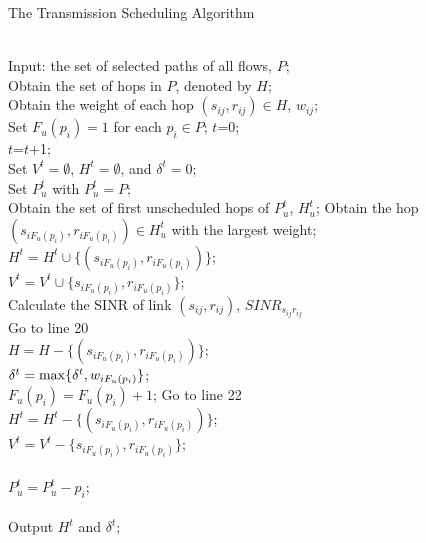 \documentclass[journal]{IEEEtran}
\begin{document}
\begin{algorithm}[htbp]
\caption{The Transmission Scheduling Algorithm} \label{alg:BAD}
\begin{algorithmic}[1]
\REQUIRE ~~\\
 Input: the set of selected paths of all flows, $P$; \\
 Obtain the set of hops in $P$, denoted by $H$; \\
Obtain the weight of each hop $(s_{ij},r_{ij})\in H$, $w_{ij}$;\\
 Set $F_u(p_i)=1$ for each $p_i\in P$; $t$=0;
\ENSURE ~~\\
\STATE  $t$=$t$+1;  \\
\STATE  Set ${V^t} = \emptyset $, ${H^t} = \emptyset $, and $\delta^{t}=0$; \\
\STATE Set $P_u^t$ with $P_u^t = P$; \\
\STATE Obtain the set of first unscheduled hops of $P_u^t$, $H_u^t$;
\STATE Obtain the hop $(s_{iF_u(p_i)}, r_{iF_u(p_i)})\in H_u^t$ with the largest weight;\\
\STATE  ${H^t} = {H^t} \cup \{ (s_{iF_u(p_i)}, r_{iF_u(p_i)})\}$; \\\STATE ${V^t} = {V^t} \cup \{ s_{iF_u(p_i)},r_{iF_u(p_i)}\} $;\\
\STATE  Calculate the SINR of link $(s_{ij},r_{ij})$, $SIN{R_{s_{ij}r_{ij}}}$\\
\STATE  Go to line 20\\
\ENDIF \ENDFOR
\STATE    $H=H-\{(s_{iF_u(p_i)}, r_{iF_u(p_i)})\}$; \\
\STATE $\delta^t={\rm{max}}\{\delta^t, w_{iF_u(p_i)}\}$;\\
\STATE $F_u(p_i)=F_u(p_i)+1$; Go to line 22\\
\STATE   ${H^t} = {H^t} - \{ (s_{iF_u(p_i)}, r_{iF_u(p_i)})\}$; \\ \STATE ${V^t} = {V^t} - \{ s_{iF_u(p_i)},r_{iF_u(p_i)}\}$;\\
\ENDIF\\
\STATE $P_u^t = P_u^t - p_i$;\\
\ENDWHILE\\

 \STATE Output $H^t$ and ${\delta ^t}$;\\
\ENDWHILE

\end{algorithmic}
\end{algorithm}
\end{document}
